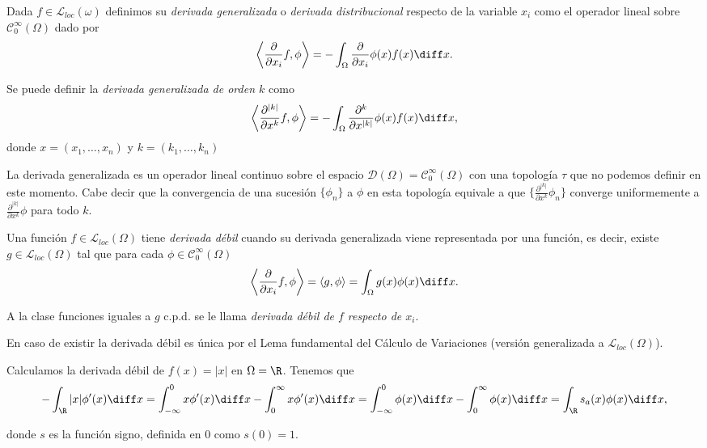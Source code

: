 \documentclass{article}
\begin{document}
\begin{definition}
  Dada $f \in \mathcal{L}_{loc}(\omega)$ definimos su \emph{derivada generalizada} o \emph{derivada
    distribucional} respecto de la variable $x_i$ como el operador lineal sobre
  $\mathcal{C}_0^{\infty}(\Omega)$ dado por
  \[ \left\langle \frac{\partial}{\partial x_i} f, \phi\right\rangle = - \int_{\Omega}
    \frac{\partial}{\partial x_i} \phi(x) f(x) \diff x. \]
\end{definition}

\begin{remark}
  Se puede definir la \emph{derivada generalizada de orden $k$} como
  \[ \left\langle \frac{\partial^{|k|}}{\partial x^k} f, \phi\right\rangle = - \int_{\Omega}
    \frac{\partial^k}{\partial x^{|k|}} \phi(x) f(x) \diff x, \] donde $x = (x_1, \ldots, x_n)$ y
  $k = (k_1, \ldots, k_n)$
\end{remark}

\begin{remark}
  La derivada generalizada es un operador lineal continuo sobre el espacio
  $\mathcal{D}(\Omega) = \mathcal{C}_0^{\infty}(\Omega)$ con una topología $\tau$ que no podemos
  definir en este momento. Cabe decir que la convergencia de una sucesión $\{\phi_n\}$ a $\phi$ en
  esta topología equivale a que $\{\frac{\partial^{|k|}}{\partial x^k} \phi_n\}$ converge
  uniformemente a $\frac{\partial^{|k|}}{\partial x^k} \phi$ para todo $k$.
\end{remark}

\begin{definition}
  Una función $f \in \mathcal{L}_{loc}(\Omega)$ tiene \emph{derivada débil} cuando su derivada
  generalizada viene representada por una función, es decir, existe
  $g \in \mathcal{L}_{loc}(\Omega)$ tal que para cada $\phi \in \mathcal{C}_0^{\infty}(\Omega)$
  \[ \left\langle \frac{\partial}{\partial x_i} f, \phi\right\rangle = \left\langle g,
      \phi\right\rangle = \int_{\Omega} g(x)\phi(x) \diff x.\]

  A la clase funciones iguales a $g$ c.p.d. se le llama \emph{derivada débil de $f$ respecto de
    $x_i$}.
\end{definition}

\begin{remark}
  En caso de existir la derivada débil es única por el Lema fundamental del Cálculo de Variaciones
  (versión generalizada a $\mathcal{L}_{loc}(\Omega)$).
\end{remark}

\begin{ex} \label{ex:der-debil:abs} Calculamos la derivada débil de $f(x) = |x|$ en $\Omega =
  \R$. Tenemos que
  \[ - \int_\R |x|\phi'(x) \diff x = \int_{-\infty}^{0} x\phi'(x) \diff x - \int_0^{\infty}
    x\phi'(x) \diff x = \int_{-\infty}^{0} \phi(x) \diff x - \int_0^{\infty} \phi(x) \diff x =
    \int_\R s_a(x) \phi(x) \diff x,\]

  donde $s$ es la función signo, definida en $0$ como $s(0)=1$.
\end{ex}
\end{document}
